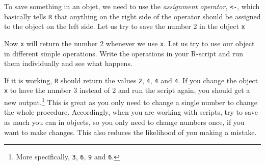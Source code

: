 \documentclass[12pt,oneside]{reedthesis}
\theoremstyle{definition}
\theoremstyle{definition}
\theoremstyle{definition}
\theoremstyle{remark}
\begin{document}
  To save something in an objet, we need to use the \emph{assignment
  operator}, \texttt{\textless{}-}, which basically tells \texttt{R} that
  anything on the right side of the operator should be assigned to the
  object on the left side. Let us try to save the number 2 in the object
  \texttt{x}
  \begin{Shaded}
  \begin{Highlighting}[]
  \StringTok{ }
  \end{Highlighting}
  \end{Shaded}
  Now \texttt{x} will return the number 2 whenever we use \texttt{x}. Let
  us try to use our object in different simple operations. Write the
  operations in your R-script and run them individually and see what
  happens.
  \begin{Shaded}
  \begin{Highlighting}[]
  \OperatorTok{*}\StringTok{ }
  \OperatorTok{*}\StringTok{ }
  \OperatorTok{+}\StringTok{ }
  \end{Highlighting}
  \end{Shaded}
  If it is working, \texttt{R} should return the values \texttt{2},
  \texttt{4}, \texttt{4} and \texttt{4}. If you change the object
  \texttt{x} to have the number 3 instead of 2 and run the script again,
  you should get a new output.\footnote{More specifically, \texttt{3},
    \texttt{6}, \texttt{9} and \texttt{6}.} This is great as you only need
  to change a single number to change the whole procedure. Accordingly,
  when you are working with scripts, try to save as much you can in
  objects, so you only need to change numbers once, if you want to make
  changes. This also reduces the likelihood of you making a mistake.
  
\end{document}
